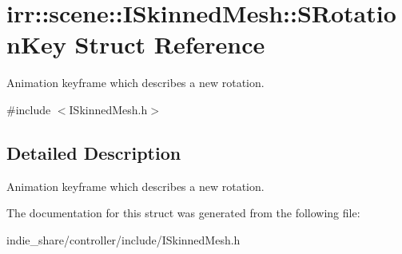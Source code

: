 \hypertarget{structirr_1_1scene_1_1ISkinnedMesh_1_1SRotationKey}{}\section{irr\+:\+:scene\+:\+:I\+Skinned\+Mesh\+:\+:S\+Rotation\+Key Struct Reference}
\label{structirr_1_1scene_1_1ISkinnedMesh_1_1SRotationKey}


Animation keyframe which describes a new rotation.  




{\ttfamily \#include $<$I\+Skinned\+Mesh.\+h$>$}



\subsection{Detailed Description}
Animation keyframe which describes a new rotation. 

The documentation for this struct was generated from the following file\+:\begin{DoxyCompactItemize}
\item 
indie\+\_\+share/controller/include/I\+Skinned\+Mesh.\+h\end{DoxyCompactItemize}
